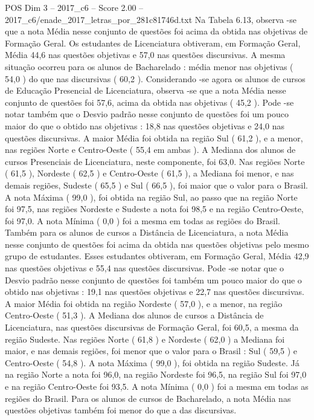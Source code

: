 \begin{textsample}{POS Dim 3 – 2017\_c6 – Score 2.00 – 2017\_c6/enade\_2017\_letras\_por\_281c81746d.txt}
Na Tabela 6.13, observa -se que a nota Média nesse conjunto de questões foi acima da obtida nas objetivas de Formação Geral.
Os estudantes de Licenciatura obtiveram, em Formação Geral, Média 44,6 nas questões objetivas e 57,0 nas questões discursivas.
A mesma situação ocorreu para os alunos de Bacharelado : média menor nas objetivas ( 54,0 ) do que nas discursivas ( 60,2 ).
Considerando -se agora os alunos de cursos de Educação Presencial de Licenciatura, observa -se que a nota Média nesse conjunto de questões foi 57,6, acima da obtida nas objetivas ( 45,2 ).
Pode -se notar também que o Desvio padrão nesse conjunto de questões foi um pouco maior do que o obtido nas objetivas : 18,8 nas questões objetivas e 24,0 nas questões discursivas.
A maior Média foi obtida na região Sul ( 61,2 ), e a menor, nas regiões Norte e Centro-Oeste ( 55,4 em ambas ).
A Mediana dos alunos de cursos Presenciais de Licenciatura, neste componente, foi 63,0.
Nas regiões Norte ( 61,5 ), Nordeste ( 62,5 ) e Centro-Oeste ( 61,5 ), a Mediana foi menor, e nas demais regiões, Sudeste ( 65,5 ) e Sul ( 66,5 ), foi maior que o valor para o Brasil.
A nota Máxima ( 99,0 ), foi obtida na região Sul, ao passo que na região Norte foi 97,5, nas regiões Nordeste e Sudeste a nota foi 98,5 e na região Centro-Oeste, foi 97,0.
A nota Mínima ( 0,0 ) foi a mesma em todas as regiões do Brasil.
Também para os alunos de cursos a Distância de Licenciatura, a nota Média nesse conjunto de questões foi acima da obtida nas questões objetivas pelo mesmo grupo de estudantes.
Esses estudantes obtiveram, em Formação Geral, Média 42,9 nas questões objetivas e 55,4 nas questões discursivas.
Pode -se notar que o Desvio padrão nesse conjunto de questões foi também um pouco maior do que o obtido nas objetivas : 19,1 nas questões objetivas e 22,7 nas questões discursivas.
A maior Média foi obtida na região Nordeste ( 57,0 ), e a menor, na região Centro-Oeste ( 51,3 ).
A Mediana dos alunos de cursos a Distância de Licenciatura, nas questões discursivas de Formação Geral, foi 60,5, a mesma da região Sudeste.
Nas regiões Norte ( 61,8 ) e Nordeste ( 62,0 ) a Mediana foi maior, e nas demais regiões, foi menor que o valor para o Brasil : Sul ( 59,5 ) e Centro-Oeste ( 54,8 ).
A nota Máxima ( 99,0 ), foi obtida na região Sudeste.
Já na região Norte a nota foi 96,0, na região Nordeste foi 96,5, na região Sul foi 97,0 e na região Centro-Oeste foi 93,5.
A nota Mínima ( 0,0 ) foi a mesma em todas as regiões do Brasil.
Para os alunos de cursos de Bacharelado, a nota Média nas questões objetivas também foi menor do que a das discursivas.

\end{textsample}
